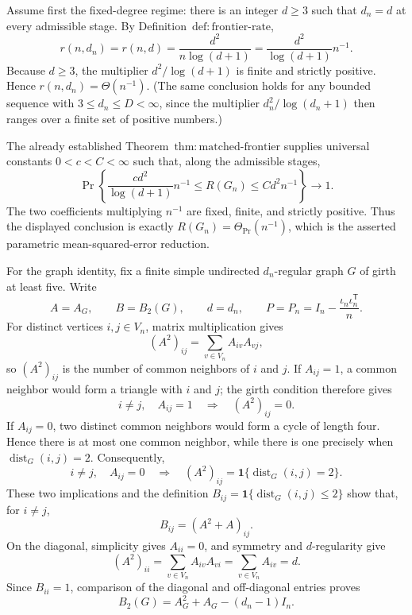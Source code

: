 Assume first the fixed-degree regime: there is an integer \(d\ge 3\) such that \(d_n=d\) at every admissible stage.  By Definition~\(\mathrm{def{:}frontier\mbox{-}rate}\),
\[
r(n,d_n)=r(n,d)=\frac{d^2}{n\log(d+1)}
=\frac{d^2}{\log(d+1)}n^{-1}.
\]
Because \(d\ge3\), the multiplier \(d^2/\log(d+1)\) is finite and strictly positive.  Hence \(r(n,d_n)=\Theta(n^{-1})\).  (The same conclusion holds for any bounded sequence with \(3\le d_n\le D<\infty\), since the multiplier \(d_n^2/\log(d_n+1)\) then ranges over a finite set of positive numbers.)

The already established Theorem~\(\mathrm{thm{:}matched\mbox{-}frontier}\) supplies universal constants \(0<c<C<\infty\) such that, along the admissible stages,
\[
\Pr\!\left\{
\frac{c d^2}{\log(d+1)}n^{-1}
\le R(G_n)\le C d^2 n^{-1}
\right\}\longrightarrow1.
\]
The two coefficients multiplying \(n^{-1}\) are fixed, finite, and strictly positive.  Thus the displayed conclusion is exactly \(R(G_n)=\Theta_{\Pr}(n^{-1})\), which is the asserted parametric mean-squared-error reduction.

For the graph identity, fix a finite simple undirected \(d_n\)-regular graph \(G\) of girth at least five.  Write
\[
A=A_G,\qquad B=B_2(G),\qquad d=d_n,
\qquad P=P_n=I_n-\frac{\iota_n\iota_n^{\mathsf T}}{n}.
\]
For distinct vertices \(i,j\in V_n\), matrix multiplication gives
\[
(A^2)_{ij}=\sum_{v\in V_n}A_{iv}A_{vj},
\]
so \((A^2)_{ij}\) is the number of common neighbors of \(i\) and \(j\).  If \(A_{ij}=1\), a common neighbor would form a triangle with \(i\) and \(j\); the girth condition therefore gives
\[
i\ne j,\quad A_{ij}=1
\quad\Longrightarrow\quad (A^2)_{ij}=0.
\]
If \(A_{ij}=0\), two distinct common neighbors would form a cycle of length four.  Hence there is at most one common neighbor, while there is one precisely when \(\operatorname{dist}_G(i,j)=2\).  Consequently,
\[
i\ne j,\quad A_{ij}=0
\quad\Longrightarrow\quad
(A^2)_{ij}=\mathbf 1\{\operatorname{dist}_G(i,j)=2\}.
\]
These two implications and the definition
\(B_{ij}=\mathbf 1\{\operatorname{dist}_G(i,j)\le2\}\) show that, for \(i\ne j\),
\[
B_{ij}=(A^2+A)_{ij}.
\]
On the diagonal, simplicity gives \(A_{ii}=0\), and symmetry and \(d\)-regularity give
\[
(A^2)_{ii}=\sum_{v\in V_n}A_{iv}A_{vi}
=\sum_{v\in V_n}A_{iv}=d.
\]
Since \(B_{ii}=1\), comparison of the diagonal and off-diagonal entries proves
\[
B_2(G)=A_G^2+A_G-(d_n-1)I_n.
\tag{1}
\]

